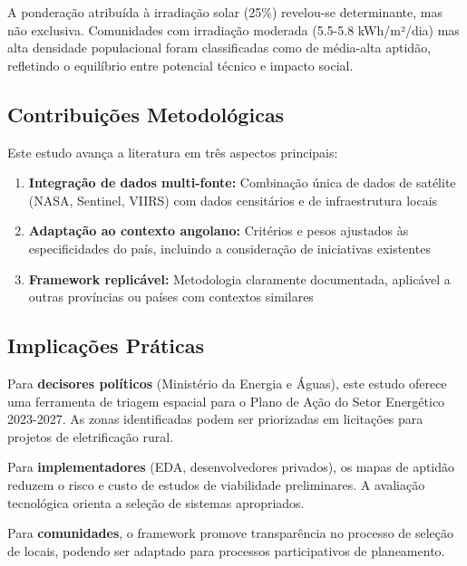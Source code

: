 \documentclass[12pt, a4paper]{article}
\begin{document}
{{{{{{{{{{{{A ponderação atribuída à irradiação solar (25\%) revelou-se determinante, mas não exclusiva. Comunidades com irradiação moderada (5.5-5.8 kWh/m²/dia) mas alta densidade populacional foram classificadas como de média-alta aptidão, refletindo o equilíbrio entre potencial técnico e impacto social.

\subsection{Contribuições Metodológicas}

Este estudo avança a literatura em três aspectos principais:
\begin{enumerate}
    \item \textbf{Integração de dados multi-fonte:} Combinação única de dados de satélite (NASA, Sentinel, VIIRS) com dados censitários e de infraestrutura locais
    \item \textbf{Adaptação ao contexto angolano:} Critérios e pesos ajustados às especificidades do país, incluindo a consideração de iniciativas existentes
    \item \textbf{Framework replicável:} Metodologia claramente documentada, aplicável a outras províncias ou países com contextos similares
\end{enumerate}

\subsection{Implicações Práticas}

Para \textbf{decisores políticos} (Ministério da Energia e Águas), este estudo oferece uma ferramenta de triagem espacial para o Plano de Ação do Setor Energético 2023-2027. As zonas identificadas podem ser priorizadas em licitações para projetos de eletrificação rural.

Para \textbf{implementadores} (EDA, desenvolvedores privados), os mapas de aptidão reduzem o risco e custo de estudos de viabilidade preliminares. A avaliação tecnológica orienta a seleção de sistemas apropriados.

Para \textbf{comunidades}, o framework promove transparência no processo de seleção de locais, podendo ser adaptado para processos participativos de planeamento.

}}}}}}}}}}}}
\end{document}
